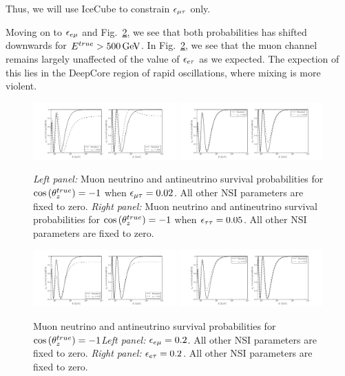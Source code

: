 Thus, we will use IceCube to constrain $\epsilon_{\mu\tau}$ only.


Moving on to $\epsilon_{e\mu}$ and Fig.~\ref{fig:eem_eet_probs}, we see that both probabilities has shifted downwards for $\Etrue > \SI{500}{\GeV}$.
In Fig.~\ref{fig:eem_eet_probs}, we see that the muon channel remains largely unaffected of the value of $\epsilon_{e\tau}$ as we expected. The expection of this lies 
in the DeepCore region of rapid oscillations, where mixing is more violent. 
\begin{figure}
    \begin{center}%
        \includegraphics[width=0.49\textwidth]{figures/emt_probs.pdf}
        \includegraphics[width=0.49\textwidth]{figures/ett_probs.pdf}
        \caption{\emph{Left panel:} Muon neutrino and antineutrino survival probabilities for
        $\cos{(\theta_z^{true})} = -1$ when $\epsilon_{\mu\tau} = 0.02$. All other NSI parameters are fixed to zero.
        \emph{Right panel:} Muon neutrino and antineutrino survival probabilities for
        $\cos{(\theta_z^{true})} = -1$ when $\epsilon_{\tau\tau} = 0.05$. All other NSI parameters are fixed to zero.}
        \label{fig:emt_ett_probs}
    \end{center}
\end{figure}


\begin{figure}
    \begin{center}
        \includegraphics[width=0.49\textwidth]{figures/eem_probs.pdf}
        \includegraphics[width=0.49\textwidth]{figures/eet_probs.pdf}
        \caption{Muon neutrino and antineutrino survival probabilities for
        $\cos{(\theta_z^{true})} = -1$\emph{Left panel:} $\epsilon_{e\mu} = 0.2$. All other NSI parameters are fixed to zero.
        \emph{Right panel:} $\epsilon_{e\tau} = 0.2$. All other NSI parameters are fixed to zero.}
        \label{fig:eem_eet_probs}
    \end{center}
\end{figure}


